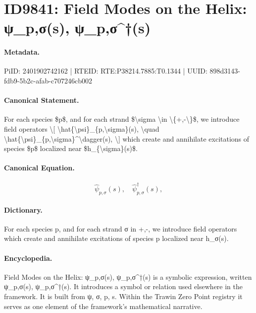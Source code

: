 \section*{ID9841: Field Modes on the Helix: ψ\_p,σ(s), ψ\_p,σ\textasciicircum{}†(s)}
\paragraph{Metadata.}
PiID: 2401902742162 | RTEID: RTE:P38214.7885:T0.1344 | UUID: 898d3143-fdb9-5b2c-afab-c707246cb002

\paragraph{Canonical Statement.}
For each species \$p\$, and for each strand \$\textbackslash{}sigma \textbackslash{}in \textbackslash{}\{+,-\textbackslash{}\}\$, we introduce field operators \textbackslash{}[ \textbackslash{}hat\{\textbackslash{}psi\}\_\{p,\textbackslash{}sigma\}(s), \textbackslash{}quad \textbackslash{}hat\{\textbackslash{}psi\}\_\{p,\textbackslash{}sigma\}\textasciicircum{}\textbackslash{}dagger(s), \textbackslash{}] which create and annihilate excitations of species \$p\$ localized near \$h\_\{\textbackslash{}sigma\}(s)\$.

\paragraph{Canonical Equation.}
\[
\hat{\psi}_{p,\sigma}(s), \quad \hat{\psi}_{p,\sigma}^\dagger(s),
\]

\paragraph{Dictionary.}
For each species p, and for each strand σ in +,-, we introduce field operators which create and annihilate excitations of species p localized near h\_σ(s).

\paragraph{Encyclopedia.}
Field Modes on the Helix: ψ\_p,σ(s), ψ\_p,σ\textasciicircum{}†(s) is a symbolic expression, written ψ\_p,σ(s), ψ\_p,σ\textasciicircum{}†(s). It introduces a symbol or relation used elsewhere in the framework. It is built from ψ, σ, p, s. Within the Trawin Zero Point registry it serves as one element of the framework's mathematical narrative.
